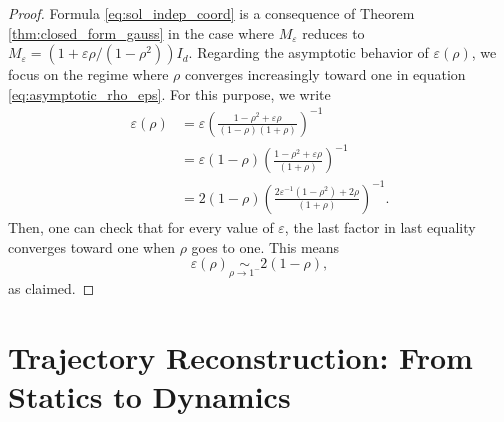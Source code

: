 \documentclass[]{article}
\numberwithin{equation}{section}
\theoremstyle{plain}
\begin{document}
\begin{proof}
	Formula \eqref{eq:sol_indep_coord} is a consequence of Theorem \ref{thm:closed_form_gauss} in the case where $M_{\varepsilon}$ reduces to $M_{\varepsilon}= (1+\varepsilon\rho/(1-\rho^2))I_d$. Regarding the asymptotic behavior of $\varepsilon(\rho)$, we focus on the regime where $\rho$ converges increasingly toward one in equation \eqref{eq:asymptotic_rho_eps}. For this purpose, we write 
\begin{align*}
	\varepsilon(\rho)& = \varepsilon \left(\frac{1-\rho^{2} + \varepsilon \rho}{(1-\rho)(1+\rho)}\right)^{-1} \\
	& = \varepsilon(1-\rho)\left(\frac{1-\rho^{2} + \varepsilon \rho}{(1+\rho)}\right)^{-1}\\
	& = 2(1-\rho)\left(\frac{2\varepsilon^{-1}(1-\rho^{2}) + 2\rho}{(1+\rho)}\right)^{-1}.
\end{align*}
Then, one can check that for every value of $\varepsilon$, the last factor in last equality converges toward one when $\rho$ goes to one. This means 
\begin{equation*}
	\varepsilon(\rho)  \underset{\rho \rightarrow 1^{-}}{\sim} 2(1-\rho),
\end{equation*}
as claimed.
\end{proof}


\section{Trajectory Reconstruction: From Statics to Dynamics}\label{sec:static_to_dyn}
\end{document}
